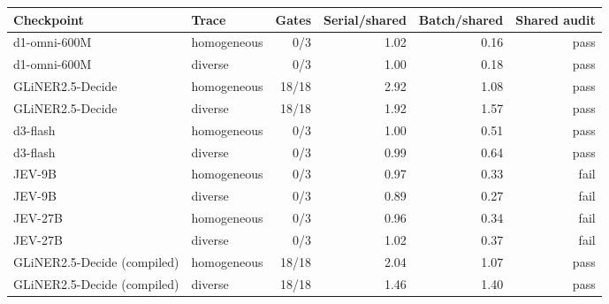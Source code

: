 \begin{tabular}{llrrrr}
\toprule
Checkpoint & Trace & Gates & Serial/shared & Batch/shared & Shared audit \\
\midrule
d1-omni-600M & homogeneous & 0/3 & 1.02 & 0.16 & pass \\
d1-omni-600M & diverse & 0/3 & 1.00 & 0.18 & pass \\
GLiNER2.5-Decide & homogeneous & 18/18 & 2.92 & 1.08 & pass \\
GLiNER2.5-Decide & diverse & 18/18 & 1.92 & 1.57 & pass \\
d3-flash & homogeneous & 0/3 & 1.00 & 0.51 & pass \\
d3-flash & diverse & 0/3 & 0.99 & 0.64 & pass \\
JEV-9B & homogeneous & 0/3 & 0.97 & 0.33 & fail \\
JEV-9B & diverse & 0/3 & 0.89 & 0.27 & fail \\
JEV-27B & homogeneous & 0/3 & 0.96 & 0.34 & fail \\
JEV-27B & diverse & 0/3 & 1.02 & 0.37 & fail \\
GLiNER2.5-Decide (compiled) & homogeneous & 18/18 & 2.04 & 1.07 & pass \\
GLiNER2.5-Decide (compiled) & diverse & 18/18 & 1.46 & 1.40 & pass \\
\bottomrule
\end{tabular}
